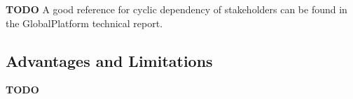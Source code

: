 \textbf{TODO} A good reference for cyclic dependency of stakeholders can be found in the GlobalPlatform technical report.








\subsection{Advantages and Limitations}
\textbf{TODO}








